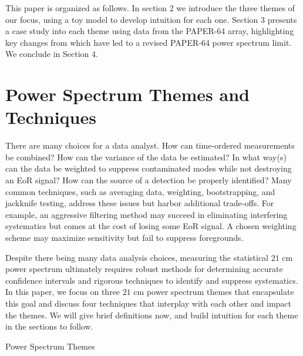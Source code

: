 \documentclass[preprint2,numberedappendix,tighten]{aastex6}  %
\begin{document}
This paper is organized as follows. In section 2 we introduce the three themes of our focus, using a toy model to develop intuition for each one. Section 3 presents a case study into each theme using data from the PAPER-64 array, highlighting key changes from \citet{ali_et_al2015} which have led to a revised PAPER-64 power spectrum limit. We conclude in Section 4.

\section{Power Spectrum Themes and Techniques}
\label{sec:Themes}

There are many choices for a data analyst. How can time-ordered measurements be combined? How can the variance of the data be estimated? In what way(s) can the data be weighted to suppress contaminated modes while not destroying an EoR signal? How can the source of a detection be properly identified? Many common techniques, such as averaging data, weighting, bootstrapping, and jackknife testing, address these issues but harbor additional trade-offs. For example, an aggressive filtering method may succeed in eliminating interfering systematics but comes at the cost of losing some EoR signal. A chosen weighting scheme may maximize sensitivity but fail to suppress foregrounds. 

Despite there being many data analysis choices, measuring the statistical $21$ cm power spectrum ultimately requires robust methods for determining accurate confidence intervals and rigorous techniques to identify and suppress systematics.  In this paper, we focus on three $21$ cm power spectrum themes that encapsulate this goal and discuss four techniques that interplay with each other and impact the themes. We will give brief definitions now, and build intuition for each theme in the sections to follow.

\begin{center}
Power Spectrum Themes
\end{center}
\end{document}
